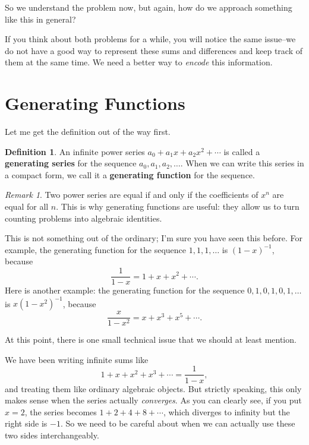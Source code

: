 \documentclass[11pt]{scrartcl}
\theoremstyle{plain}
\theoremstyle{definition}
\newtheorem*{definition}{Definition}
\theoremstyle{remark}
\newtheorem{remark}{Remark}
\newcounter{problem}
\begin{document}
\noindent So we understand the problem now, but again, how do we approach something like this in general?

\bigskip

\noindent If you think about both problems for a while, you will notice the same issue--we do not have a good way to represent these sums and differences and keep track of them at the same time. We need a better way to \emph{encode} this information.

\section{Generating Functions}
Let me get the definition out of the way first.
\begin{definition}
An infinite power series $a_0 + a_1x + a_2x^2 + \cdots$ is called a \textbf{generating series} for the sequence $a_0, a_1, a_2, \ldots$. When we can write this series in a compact form, we call it a \textbf{generating function} for the sequence.
\end{definition}

\begin{remark}
Two power series are equal if and only if the coefficients of $x^n$ are equal for all $n$. This is why generating functions are useful: they allow us to turn counting problems into algebraic identities.
\end{remark}

\noindent This is not something out of the ordinary; I'm sure you have seen this before. For example, the generating function for the sequence $1, 1, 1, \ldots$ is $(1-x)^{-1}$, because
\[
\frac{1}{1-x} = 1 + x + x^2 + \cdots.
\]
Here is another example: the generating function for the sequence $0, 1, 0, 1, 0, 1, \ldots$ is $x(1-x^2)^{-1}$, because
\[
\frac{x}{1-x^2} = x + x^3 + x^5 + \cdots.
\]

\bigskip

\noindent At this point, there is one small technical issue that we should at least mention.

\noindent We have been writing infinite sums like
\[
1 + x + x^2 + x^3 + \cdots = \frac{1}{1-x},
\]
and treating them like ordinary algebraic objects. But strictly speaking, this only makes sense when the series actually \emph{converges}. As you can clearly see, if you put $x=2$, the series becomes $1 + 2 + 4 + 8 + \cdots$, which diverges to infinity but the right side is $-1$. So we need to be careful about when we can actually use these two sides interchangeably.
\end{document}

